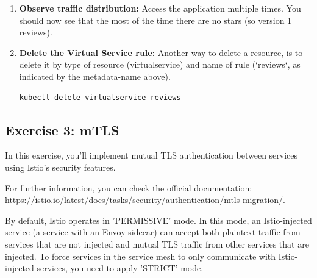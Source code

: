 \documentclass{article}
\begin{document}
\begin{enumerate}
    \item \textbf{Observe traffic distribution:} 
    Access the application multiple times. You should now see that the most of the time there are no stars (so version 1 reviews).
    
    \item \textbf{Delete the Virtual Service rule:} 
    Another way to delete a resource, is to delete it by type of resource (virtualservice) and name of rule (`reviews`, as indicated by the metadata-name above).
    \begin{lstlisting}
kubectl delete virtualservice reviews
    \end{lstlisting}
\end{enumerate}

\subsection{Exercise 3: mTLS}
In this exercise, you'll implement mutual TLS authentication between services using Istio's security features.

For further information, you can check the official documentation: \\
\footnotesize\url{https://istio.io/latest/docs/tasks/security/authentication/mtls-migration/}.

\normalsize
By default, Istio operates in 'PERMISSIVE' mode. In this mode, an Istio-injected service (a service with an Envoy sidecar) can accept both plaintext traffic from services that are not injected and mutual TLS traffic from other services that are injected. To force services in the service mesh to only communicate with Istio-injected services, you need to apply 'STRICT' mode. \\
\end{document}
